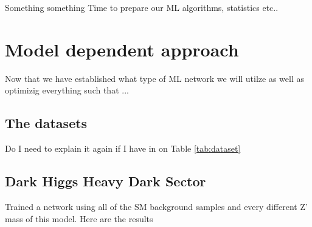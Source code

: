 \documentclass[14pt, a4paper]{book}
\begin{document}
\label{chap:Best_ML}
Something something Time to prepare our ML algorithms, statistics etc..

\chapter{Model dependent approach}
Now that we have established what type of ML network we will utilze as well as optimizig everything such that ... 

\section{The datasets}
Do I need to explain it again if I have in on Table \ref{tab:dataset}

\newpage
\graphicspath{{../../../Plots/}}
\section{Dark Higgs Heavy Dark Sector}
Trained a network using all of the SM background samples and every different Z' mass of this model. Here are the results
\end{document}
